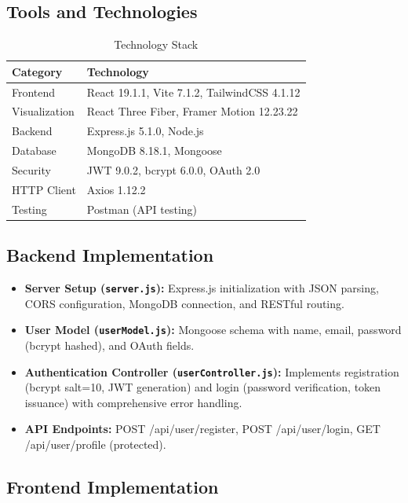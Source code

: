 \documentclass[12pt,a4paper]{article}
\begin{document}
\subsection{Tools and Technologies}

\begin{table}[H]
\centering
\caption{Technology Stack}
\begin{tabular}{@{}ll@{}}
\toprule
\textbf{Category} & \textbf{Technology} \\
\midrule
Frontend & React 19.1.1, Vite 7.1.2, TailwindCSS 4.1.12 \\
Visualization & React Three Fiber, Framer Motion 12.23.22 \\
Backend & Express.js 5.1.0, Node.js \\
Database & MongoDB 8.18.1, Mongoose \\
Security & JWT 9.0.2, bcrypt 6.0.0, OAuth 2.0 \\
HTTP Client & Axios 1.12.2 \\
Testing & Postman (API testing) \\
\bottomrule
\end{tabular}
\end{table}

\subsection{Backend Implementation}

\begin{itemize}[leftmargin=*]
\item \textbf{Server Setup (\texttt{server.js}):} Express.js initialization with JSON parsing, CORS configuration, MongoDB connection, and RESTful routing.
\item \textbf{User Model (\texttt{userModel.js}):} Mongoose schema with name, email, password (bcrypt hashed), and OAuth fields.
\item \textbf{Authentication Controller (\texttt{userController.js}):} Implements registration (bcrypt salt=10, JWT generation) and login (password verification, token issuance) with comprehensive error handling.
\item \textbf{API Endpoints:} POST /api/user/register, POST /api/user/login, GET /api/user/profile (protected).
\end{itemize}

\subsection{Frontend Implementation}
\end{document}
